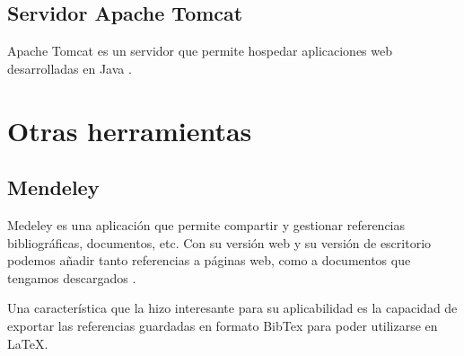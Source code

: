 \subsection{Servidor Apache Tomcat}

Apache Tomcat es un servidor que permite hospedar aplicaciones web desarrolladas en Java \cite{tomcat:wiki}.

\section{Otras herramientas}

\subsection{Mendeley}

Medeley es una aplicación que permite compartir y gestionar referencias bibliográficas, documentos, etc. Con su versión web y su versión de escritorio podemos añadir tanto referencias a páginas web, como a documentos que tengamos descargados \cite{mende:wiki}.

Una característica que la hizo interesante para su aplicabilidad es la capacidad de exportar las referencias guardadas en formato BibTex para poder utilizarse en LaTeX.
